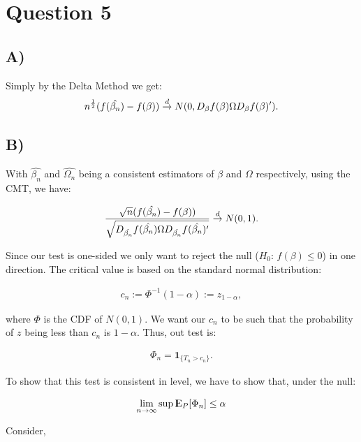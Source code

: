 \documentclass[12pt]{paper}
\newcommand{\E}{{\rm I\kern-.3em E}}
\begin{document}



\section*{Question 5}

\subsection*{A)} Simply by the Delta Method we get:
\begin{align*}
n^{\frac{1}{2}}(f(\hat{\beta_n})-f(\beta))\overset{d}{\to} N(0,D_{\beta}f(\beta)\Omega D_{\beta}f(\beta)').
\end{align*}


\subsection*{B)}
With $\hat{\beta_n}$ and $\hat{\Omega_n}$ being a consistent estimators of $\beta$ and $\Omega$ respectively, using the CMT, we have:

\begin{align*}
\frac{\sqrt{n}(f(\hat{\beta_n})-f(\beta))}{\sqrt{D_{\hat{\beta_n}}f(\hat{\beta_n})\Omega D_{\hat{\beta_n}}f(\hat{\beta_n})'}} \overset{d}{\to} N(0,1).
\end{align*}

Since our test is one-sided we only want to reject the null ($H_0$: $f(\beta) \leq 0$) in one direction. The critical value is based on the standard normal distribution:

\begin{align*}
c_n:=\Phi^{-1}(1-\alpha):=z_{1-\alpha},
\end{align*}

where $\Phi$ is the CDF of $N(0,1)$. We want our $c_n$ to be such that the probability of $z$ being less than $c_n$ is $1-\alpha$. Thus, out test is:

\begin{align*}
\Phi_n=\textbf{1}_{\{T_n>c_n\}}.
\end{align*}

To show that this test is consistent in level, we have to show that, under the null:

\begin{align*}
\lim_{n \to \infty} \sup \E_P[\Phi_n] \leq \alpha
\end{align*}

Consider,
\end{document}
